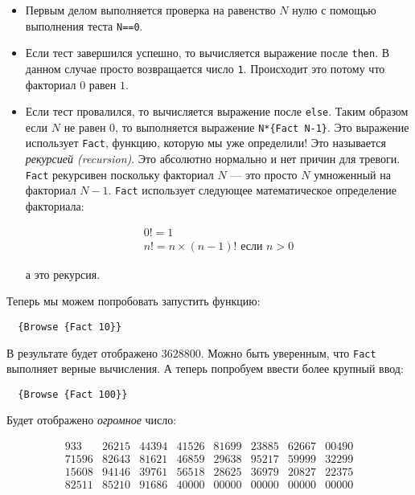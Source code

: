 \begin{itemize}

  \item{Первым делом выполняется проверка на равенство $N$ нулю с помощью выполнения теста \lstinline|N==0|.}

\item{Если тест завершился успешно, то вычисляется выражение после \lstinline|then|. В данном случае просто возвращается число \lstinline|1|. Происходит это потому что факториал $0$ равен $1$.}


\item{Если тест провалился, то вычисляется выражение после \lstinline|else|. Таким образом если $N$ не равен $0$, то выполняется выражение \lstinline|N*{Fact N-1}|. Это выражение использует \lstinline|Fact|, функцию, которую мы уже определили! Это называется \emph{рекурсией (recursion)}. Это абсолютно нормально и нет причин для тревоги. \lstinline|Fact| рекурсивен поскольку факториал $N$ --- это просто $N$ умноженный на факториал $N-1$. \lstinline|Fact| использует следующее математическое определение факториала:

  $$
  \begin{array}{l}
    0! = 1 \\
    n! = n \times (n-1)! \text{ если } n > 0
  \end{array}
$$

а это рекурсия.}
\end{itemize}

Теперь мы можем попробовать запустить функцию:

\begin{lstlisting}
  {Browse {Fact 10}}
\end{lstlisting}


В результате будет отображено $3628800$. Можно быть уверенным, что \lstinline|Fact| выполняет верные вычисления. А теперь попробуем ввести более крупный ввод:

\begin{lstlisting}
  {Browse {Fact 100}}
  \end{lstlisting}

Будет отображено \emph{огромное} число:

$$
  \begin{array}{rrrrrrrr}
    933 & 26215 & 44394 & 41526 & 81699 & 23885 & 62667 & 00490 \\
    71596 & 82643 & 81621 & 46859 & 29638 & 95217 & 59999 & 32299 \\
    15608 & 94146 & 39761 & 56518 & 28625 & 36979 & 20827 & 22375 \\
    82511 & 85210 & 91686 & 40000 & 00000 & 00000 & 00000 & 00000
  \end{array}
$$


